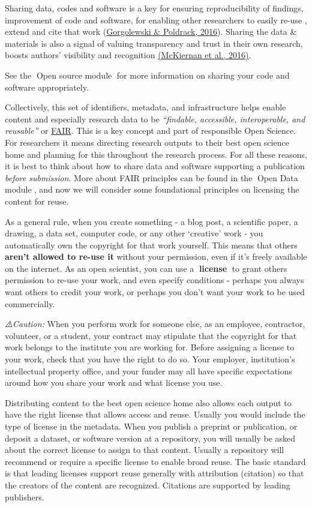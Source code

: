 \documentclass[
  letterpaper,
  DIV=11,
  numbers=noendperiod]{scrreport}
\begin{document}
Sharing data, codes and software is a key for ensuring reproducibility
of findings, improvement of code and software, for enabling other
researchers to easily re-use , extend and cite that work
(\href{https://doi.org/10.1101/039354}{Gorgolewski \& Poldrack, 2016}).
Sharing the data \& materials is also a signal of valuing transparency
and trust in their own research, boosts authors' visibility and
recognition \href{https://doi.org/10.7554/eLife.16800}{(McKiernan et
al., 2016)}.

See the 🔗Open source module🔗 for more information on sharing your code
and software appropriately.

Collectively, this set of identifiers, metadata, and infrastructure
helps enable content and especially research data to be
\emph{``findable, accessible, interoperable, and reusable''} or
\href{https://www.go-fair.org/fair-principles/}{FAIR}. This is a key
concept and part of responsible Open Science. For researchers it means
directing research outputs to their best open science home and planning
for this throughout the research process. For all these reasons, it is
best to think about how to share data and software supporting a
publication \emph{before submission}. More about FAIR principles can be
found in the 🔗Open Data module🔗, and now we will consider some
foundational principles on licensing the content for reuse.

As a general rule, when you create something - a blog post, a scientific
paper, a drawing, a data set, computer code, or any other `creative'
work - you automatically own the copyright for that work yourself. This
means that others \textbf{aren't allowed to re-use it} without your
permission, even if it's freely available on the internet. As an open
scientist, you can use a \textbf{📖{license}📖} to grant others
permission to re-use your work, and even specify conditions - perhaps
you always want others to credit your work, or perhaps you don't want
your work to be used commercially.

\emph{⚠️Caution:} When you perform work for someone else, as an
employee, contractor, volunteer, or a student, your contract may
stipulate that the copyright for that work belongs to the institute you
are working for. Before assigning a license to your work, check that you
have the right to do so. Your employer, institution's intellectual
property office, and your funder may all have specific expectations
around how you share your work and what license you use.

Distributing content to the best open science home also allows each
output to have the right license that allows access and reuse. Usually
you would include the type of license in the metadata. When you publish
a preprint or publication, or deposit a dataset, or software version at
a repository, you will usually be asked about the correct license to
assign to that content. Usually a repository will recommend or require a
specific license to enable broad reuse. The basic standard is that
leading licenses support reuse generally with attribution (citation) so
that the creators of the content are recognized. Citations are supported
by leading publishers.
\end{document}
